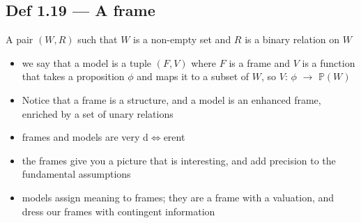 \documentclass[10pt, a4paper, twoside]{article}
\begin{document}
\subsection{Def 1.19 --- A frame}
A pair $(W, R)$ such that $W$ is a non-empty set and $R$ is a binary relation on $W$
\begin{itemize}
  \item we say that a model is a tuple $(F, V)$ where $F$ is a frame and $V$ is a function that takes a proposition $\phi$ and maps it to a subset of $W$, so $V$: $\phi$ $\rightarrow$ $\mathbb{P}(W)$
  \item Notice that a frame is a structure, and a model is an enhanced frame, enriched by a set of unary relations
  \item frames and models are very d$\iff$erent
  \item the frames give you a picture that is interesting, and add precision to the fundamental assumptions
  \item models assign meaning to frames; they are a frame with a valuation, and dress our frames with contingent information
\end{itemize}
\end{document}
